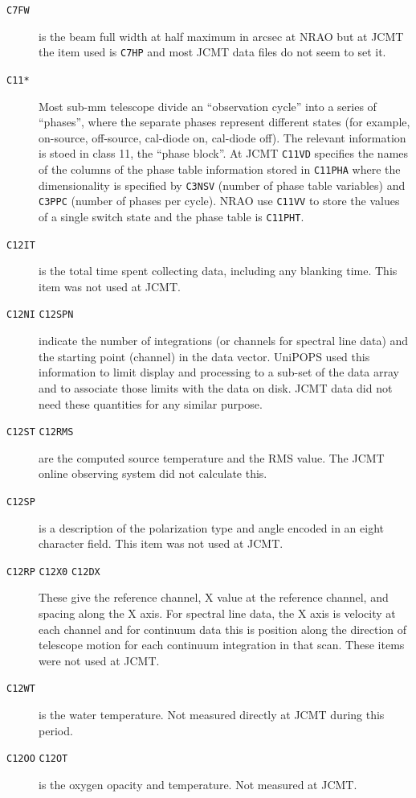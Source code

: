 \documentclass[final,authoryear,5p,times,twocolumn]{elsarticle}
\begin{document}
\begin{description}
\item[\texttt{C7FW}] is the beam full width at half maximum in arcsec
  at NRAO but at JCMT the item used is \texttt{C7HP} and most JCMT data
  files do not seem to set it.

\item[\texttt{C11*}]
  Most sub-mm telescope divide an ``observation cycle'' into a series
  of ``phases'', where the separate phases represent different states
  (for example, on-source, off-source, cal-diode on, cal-diode
  off). The relevant information is stoed in class 11, the ``phase
  block''.  At JCMT \texttt{C11VD} specifies the names of the columns
  of the phase table information stored in \texttt{C11PHA} where the
  dimensionality is specified by \texttt{C3NSV} (number of phase table
  variables) and \texttt{C3PPC} (number of phases per cycle). NRAO use
  \texttt{C11VV} to store the values of a single switch state and the
  phase table is \texttt{C11PHT}.

\item[\texttt{C12IT}] is the total time spent collecting data,
  including any blanking time.  This item was not used at JCMT.

\item[\texttt{C12NI} \texttt{C12SPN}] indicate the number of integrations (or
  channels for spectral line data) and the starting point (channel) in the data vector.
  UniPOPS used this information to limit display and processing to a sub-set of the 
  data array and to associate those limits with the data on disk. 
  JCMT data did not need these quantities for any 
  similar purpose.

\item[\texttt{C12ST} \texttt{C12RMS}] are the computed source
  temperature and the RMS value. The JCMT online observing system did
  not calculate this.

\item[\texttt{C12SP}] is a description of the polarization type and
  angle encoded in an eight character field. This item was not used at
  JCMT.

\item[\texttt{C12RP} \texttt{C12X0} \texttt{C12DX}] These give the
  reference channel, X value at the reference channel, and spacing along
  the X axis.  For spectral line data, the X axis is velocity at
  each channel and for continuum data this is position along the
  direction of telescope motion for each continuum integration in
  that scan.  These items were not used at JCMT.

\item[\texttt{C12WT}] is the water temperature. Not measured directly
  at JCMT during this period.

\item[\texttt{C12OO} \texttt{C12OT}] is the oxygen opacity and
  temperature. Not measured at JCMT.

\end{description}
\end{document}
